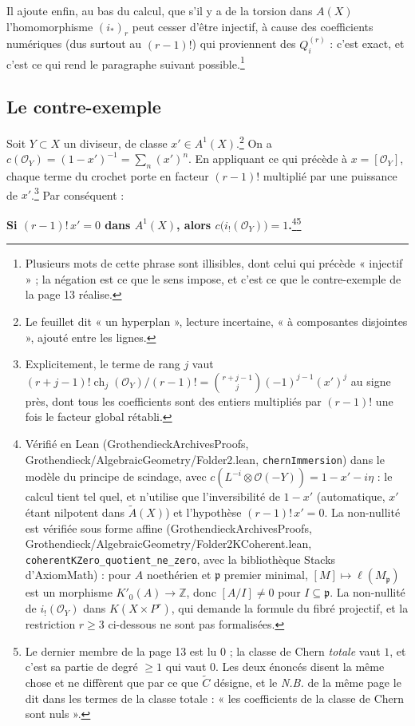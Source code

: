 \documentclass[11pt,a4paper]{article}
\begin{document}
Il ajoute enfin, au bas du calcul, que s'il y a de la torsion dans $A(X)$ l'homomorphisme
$(i_{*})_{r}$ peut cesser d'être injectif, à cause des coefficients numériques
(dus surtout au $(r-1)!$) qui proviennent des $Q^{(r)}_{i}$ : c'est
exact, et c'est ce qui rend le paragraphe suivant possible.\footnote{Plusieurs
mots de cette phrase sont illisibles, dont celui qui précède « injectif » ; la
négation est ce que le sens impose, et c'est ce que le contre-exemple de la
page 13 réalise.}

\subsection*{Le contre-exemple}

Soit $Y \subset X$ un diviseur, de classe $x' \in A^{1}(X)$.\footnote{Le
feuillet dit « un hyperplan », lecture incertaine, « à composantes
disjointes », ajouté entre les lignes.} On a
$c(\mathcal{O}_{Y}) = (1 - x')^{-1} = \sum_{n} (x')^{n}$. En appliquant ce qui
précède à $x = [\mathcal{O}_{Y}]$, chaque terme du crochet porte en facteur
$(r-1)!$ multiplié par une puissance de $x'$.\footnote{Explicitement, le terme
de rang $j$ vaut $(r+j-1)!\operatorname{ch}_{j}(\mathcal{O}_{Y})/(r-1)! =
\binom{r+j-1}{j}(-1)^{j-1}(x')^{j}$ au signe près, dont tous les coefficients
sont des entiers multipliés par $(r-1)!$ une fois le facteur global rétabli.}
Par conséquent :

\textbf{Si $(r-1)!\,x' = 0$ dans $A^{1}(X)$, alors
$c\bigl(i_{!}(\mathcal{O}_{Y})\bigr) = 1$.}\footnote{Vérifié en Lean
(GrothendieckArchivesProofs, Grothendieck/AlgebraicGeometry/Folder2.lean, \texttt{chernImmersion}) dans le modèle du
principe de scindage, avec $c(L^{-i} \otimes \mathcal{O}(-Y)) = 1 - x' -
i\eta$ : le calcul tient tel quel, et n'utilise que l'inversibilité de
$1 - x'$ (automatique, $x'$ étant nilpotent dans $\widetilde{A}(X)$) et
l'hypothèse $(r-1)!\,x' = 0$. La non-nullité est vérifiée sous forme affine
(GrothendieckArchivesProofs, Grothendieck/AlgebraicGeometry/Folder2KCoherent.lean,
\texttt{coherentKZero\_quotient\_ne\_zero}, avec la bibliothèque Stacks d'AxiomMath) : pour $A$
noethérien et $\mathfrak{p}$ premier minimal, $[M] \mapsto
\ell(M_{\mathfrak{p}})$ est un morphisme $K'_0(A) \to \mathbb{Z}$, donc
$[A/I] \neq 0$ pour $I \subseteq \mathfrak{p}$. La non-nullité de
$i_{!}(\mathcal{O}_{Y})$ dans $K(X \times P^{r})$, qui demande la formule du
fibré projectif, et la restriction $r \geqslant 3$ ci-dessous ne sont pas
formalisées.}\footnote{Le dernier membre de la
page 13 est lu $0$ ; la classe de Chern \emph{totale} vaut $1$, et c'est sa
partie de degré $\geqslant 1$ qui vaut $0$. Les deux énoncés disent la même
chose et ne diffèrent que par ce que $\widetilde{C}$ désigne, et le
\emph{N.B.} de la même page le dit dans les termes de la classe totale :
« les coefficients de la classe de Chern sont nuls ».}
\end{document}
